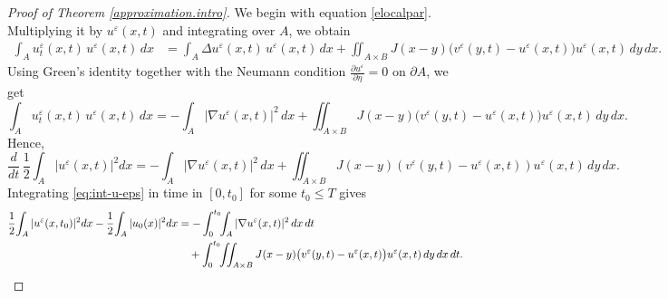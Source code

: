 \documentclass[10pt,a4paper]{amsart}
\begin{document}
\begin{proof}[Proof of Theorem \ref{approximation.intro}]
We begin with equation \eqref{elocalpar}. Multiplying it by 
$u^\varepsilon(x,t)$ and integrating over $A$, we obtain
\begin{align*}
\int_A u_t^\varepsilon(x,t)\,u^\varepsilon(x,t)\,dx
&=
\int_A \Delta u^\varepsilon(x,t)\,u^\varepsilon(x,t)\,dx
  + \iint_{A\times B}
    J(x-y)\big( v^\varepsilon(y,t)-u^\varepsilon(x,t) \big)
    u^\varepsilon(x,t)\,dy\,dx.
\end{align*}
Using Green's identity together with the Neumann condition 
$\frac{\partial u^\varepsilon}{\partial \eta} =0$ on $\partial A$, we get
\[
\int_A u_t^\varepsilon(x,t)\,u^\varepsilon(x,t)\,dx
=
-\int_A |\nabla u^\varepsilon(x,t)|^2\,dx
+\iint_{A\times B}
  J(x-y)\big( v^\varepsilon(y,t)-u^\varepsilon(x,t) \big)
  u^\varepsilon(x,t)\,dy\,dx.
\]
Hence,
\begin{equation}\label{eq:int-u-eps}
\frac{d}{dt}\,\frac12\!\int_A |u^\varepsilon(x,t)|^2 dx
=
-\int_A |\nabla u^\varepsilon(x,t)|^2\,dx
+\iint_{A\times B} J(x-y)
   (v^\varepsilon(y,t)-u^\varepsilon(x,t))u^\varepsilon(x,t)\,dy\,dx.
\end{equation}
Integrating \eqref{eq:int-u-eps} in time in $[0,t_0]$ for some $t_0\leq T$ gives
\begin{align}\label{intelocalpar}
\frac12\!\int_A |u^\varepsilon(x,{t_0})|^2 dx
-\frac12\!\int_A |u_0(x)|^2 dx
&=
-\int_0^{t_0}\!\!\int_A |\nabla u^\varepsilon(x,t)|^2\,dx\,dt
\notag\\
&\quad
+\int_0^{t_0}\!\!\iint_{A\times B}
  J(x-y)\big( v^\varepsilon(y,t)-u^\varepsilon(x,t) \big)u^\varepsilon(x,t)
\,dy\,dx\,dt.
\end{align}


\end{proof}
\end{document}
